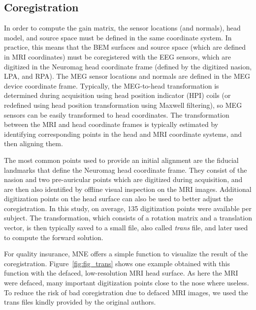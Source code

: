 \subsection{Coregistration}
In order to compute the gain matrix, the sensor locations (and normals), head model, and source space must be defined in the same coordinate system. In practice, this means that the BEM surfaces and source space (which are defined in MRI coordinates) must be coregistered with the EEG sensors, which are digitized in the Neuromag head coordinate frame (defined by the digitized nasion, LPA, and RPA). The MEG sensor locations and normals are defined in the MEG device coordinate frame. Typically, the MEG-to-head transformation is determined during acquisition using head position indicator (HPI) coils (or redefined using head position transformation using Maxwell filtering), so MEG sensors can be easily transformed to head coordinates. The transformation between the MRI and head coordinate frames is typically estimated by identifying corresponding points in the head and MRI coordinate systems, and then aligning them.

The most common points used to provide an initial alignment are the fiducial landmarks that define the Neuromag head coordinate frame. They consist of the nasion and two pre-auricular points which are digitized during acquisition, and are then also identified by offline visual inspection on the MRI images. Additional digitization points on the head surface can also be used to better adjust the coregistration. In this study, on average, 135 digitization points were available per subject. The transformation, which consists of a rotation matrix and a translation vector, is then typically saved to a small file, also called \emph{trans} file, and later used to compute the forward solution.

For quality insurance, MNE offers a simple function to visualize the result of the coregistration.
Figure~\ref{fig:fig_trans} shows one example obtained with this function with the defaced, low-resolution MRI head surface. As here the MRI were defaced, many important digitization points close to the nose where useless. To reduce the risk of bad coregistration due to defaced MRI images, we used the trans files kindly provided by the original authors.
    
